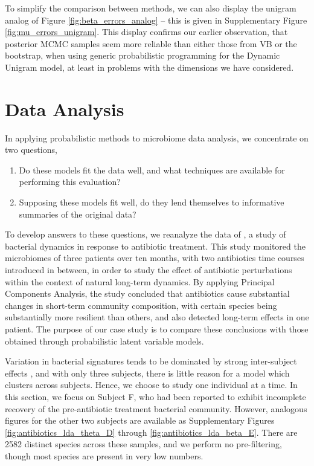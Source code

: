 \documentclass[oupdraft]{bio}
\begin{document}
To simplify the comparison between methods, we can also display the unigram
analog of Figure \ref{fig:beta_errors_analog} -- this is given in Supplementary
Figure \ref{fig:mu_errors_unigram}. This display confirms our earlier
observation, that posterior MCMC samples seem more reliable than either those
from VB or the bootstrap, when using generic probabilistic programming for the
Dynamic Unigram model, at least in problems with the dimensions we have
considered.

\section{Data Analysis}
\label{sec:data_analysis}

In applying probabilistic methods to microbiome data analysis, we concentrate on
two questions,
\begin{enumerate}
\item Do these models fit the data well, and what techniques are available for
  performing this evaluation?
\item Supposing these models fit well, do they lend themselves to informative
  summaries of the original data?
\end{enumerate}

To develop answers to these questions, we reanalyze the data of
\cite{dethlefsen2011incomplete}, a study of bacterial dynamics in response to
antibiotic treatment. This study monitored the microbiomes of three patients
over ten months, with two antibiotics time courses introduced in between, in
order to study the effect of antibiotic perturbations within the context of
natural long-term dynamics. By applying Principal Components Analysis, the study
concluded that antibiotics cause substantial changes in short-term community
composition, with certain species being substantially more resilient than
others, and also detected long-term effects in one patient. The purpose of our
case study is to compare these conclusions with those obtained through
probabilistic latent variable models.

Variation in bacterial signatures tends to be dominated by strong inter-subject
effects \citep{eckburg2005diversity}, and with only three subjects, there is
little reason for a model which clusters across subjects. Hence, we choose to
study one individual at a time. In this section, we focus on Subject F, who had
been reported to exhibit incomplete recovery of the pre-antibiotic treatment
bacterial community. However, analogous figures for the other two subjects are
available as Supplementary Figures \ref{fig:antibiotics_lda_theta_D} through
\ref{fig:antibiotics_lda_beta_E}. There are 2582 distinct species across these
samples, and we perform no pre-filtering, though most species are present in
very low numbers.
\end{document}
